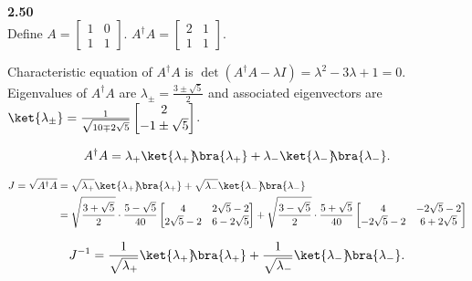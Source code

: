 \documentclass[10pt]{book}
\newcommand{\kb}[1]{\ket{#1}\hspace{-1mm} \bra{#1}} %
\newcommand{\Textbf}[1]{\hspace{3mm}\\ \textbf{#1}\\}
\begin{document}
	
	
	\Textbf{2.50}
	
	Define
	$A = \begin{bmatrix}
		1 & 0 \\
		1 & 1
	\end{bmatrix}$.
	$A^\dagger A = \begin{bmatrix}
		2 & 1 \\
		1 & 1
	\end{bmatrix}$.
	
	Characteristic equation of $A^\dagger A$ is $\det(A^\dagger A - \lambda I) = \lambda^2 - 3 \lambda + 1 = 0$.
	Eigenvalues of $A^\dagger A$ are $\lambda_\pm = \frac{3 \pm \sqrt{5}}{2}$
	and associated eigenvectors are $\ket{\lambda_\pm} = \frac{1}{\sqrt{10 \mp 2 \sqrt{5}}} \begin{bmatrix}
		2 \\
		-1 \pm \sqrt{5}
	\end{bmatrix} $.
	
	\begin{equation}
\begin{aligned}
		A^\dagger A = \lambda_+ \kb{\lambda_+} + \lambda_- \kb{\lambda_-}.
	\end{aligned}
\end{equation}
	
	\begin{equation}
\begin{aligned}
		J = \sqrt{A^\dagger A} &= \sqrt{\lambda_+} \kb{\lambda_+} + \sqrt{\lambda_-} \kb{\lambda_-}\\
		&= \sqrt{\frac{3 + \sqrt{5}}{2}} \cdot \frac{5 - \sqrt{5}}{40} \begin{bmatrix}
			4 & 2\sqrt{5} -2 \\
			2 \sqrt{5} - 2 & 6 -2\sqrt{5}
		\end{bmatrix}
		+
		\sqrt{\frac{3 - \sqrt{5}}{2}} \cdot \frac{5 + \sqrt{5}}{40} \begin{bmatrix}
			4 & -2\sqrt{5} -2 \\
			-2 \sqrt{5} - 2 & 6 +2\sqrt{5}
		\end{bmatrix}
	\end{aligned}
\end{equation}
	
	
	\begin{equation}
\begin{aligned}
		J^{-1} = \frac{1}{ \sqrt{\lambda_+} } \kb{\lambda_+} + \frac{1}{ \sqrt{\lambda_-} } \kb{\lambda_-}.
	\end{aligned}
\end{equation}
	
\end{document}
